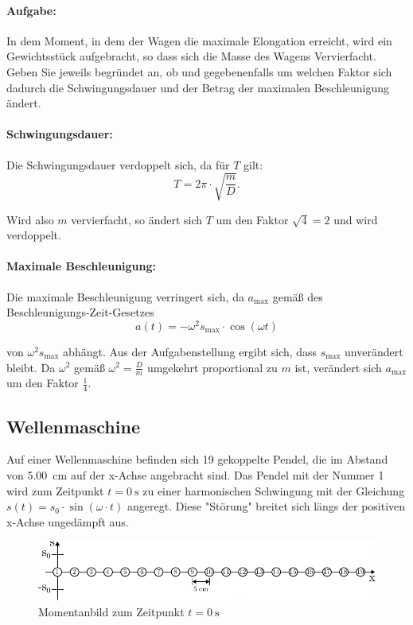 \documentclass{ajc}
\begin{document}
	\paragraph{Aufgabe:}In dem Moment, in dem der Wagen die maximale Elongation erreicht, wird ein Gewichtsstück aufgebracht, so dass sich die Masse des Wagens Vervierfacht. Geben Sie jeweils begründet an, ob und gegebenenfalls um welchen Faktor sich dadurch die Schwingungsdauer und der Betrag der maximalen Beschleunigung ändert.
	
	\paragraph{Schwingungsdauer:} Die Schwingungsdauer verdoppelt sich, da für $T$ gilt:
	\begin{equation}
		T = 2\pi \cdot \sqrt{\frac{m}{D}}.
	\end{equation}
	
	Wird also $m$ vervierfacht, so ändert sich $T$ um den Faktor $\sqrt{4} = 2$ und wird verdoppelt.
	
	\paragraph{Maximale Beschleunigung:} Die maximale Beschleunigung verringert sich, da $a_\text{max}$ gemäß des Beschleunigungs-Zeit-Gesetzes 
	\begin{equation}
		a(t) = -\omega^2 s_\text{max} \cdot \cos\left(\omega t\right)
	\end{equation}
	
	von $\omega^2 s_\text{max}$ abhängt. Aus der Aufgabenstellung ergibt sich, dass $s_\text{max}$ unverändert bleibt. Da $\omega^2$ gemäß $\omega^2 = \frac{D}{m}$ umgekehrt proportional zu $m$ ist, verändert sich $a_\text{max}$ um den Faktor $\frac{1}{4}$.
	
	\subsection{Wellenmaschine}
	Auf einer Wellenmaschine befinden sich 19 gekoppelte Pendel, die im Abstand von \SI{5,00}{\centi\meter} auf der x-Achse angebracht sind. Das Pendel mit der Nummer 1 wird zum Zeitpunkt $t = \SI{0}{\second}$ zu einer harmonischen Schwingung mit der Gleichung $s(t) = s_0 \cdot \sin(\omega \cdot t)$ angeregt. Diese "Störung" breitet sich längs der positiven x-Achse ungedämpft aus.
	
	\begin{figure}[ht]
		\centering
		\includegraphics[width=\textwidth]{ph_003_momentanbild_0s.pdf}
		\caption{Momentanbild zum Zeitpunkt $t = \SI{0}{\second}$}
		\label{fig:mom_0s}
	\end{figure}
	
\end{document}
